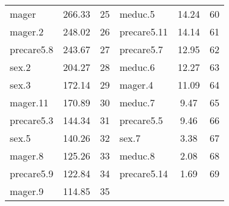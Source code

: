 \begin{table}[htbp]
\begin{tabular}{lcr|lcr}
mager & 266.33 & 25 & meduc.5 & 14.24 & 60 \\
mager.2 & 248.02 & 26 & precare5.11 & 14.14 & 61 \\
precare5.8 & 243.67 & 27 & precare5.7 & 12.95 & 62 \\
sex.2 & 204.27 & 28 & meduc.6 & 12.27 & 63 \\
sex.3 & 172.14 & 29 & mager.4 & 11.09 & 64 \\
mager.11 & 170.89 & 30 & meduc.7 & 9.47 & 65 \\
precare5.3 & 144.34 & 31 & precare5.5 & 9.46 & 66 \\
sex.5 & 140.26 & 32 & sex.7 & 3.38 & 67 \\
mager.8 & 125.26 & 33 & meduc.8 & 2.08 & 68 \\
precare5.9 & 122.84 & 34 & precare5.14 & 1.69 & 69 \\
mager.9 & 114.85 & 35 & & & \\
\hline
\end{tabular}
\end{table}
\endgroup
